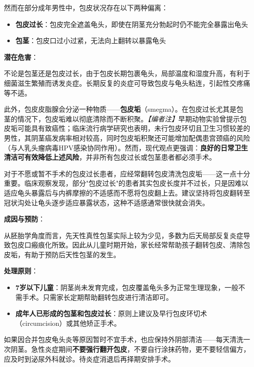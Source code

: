 然而在部分成年男性中，包皮状况存在以下两种偏离：

\begin{itemize}
	\item \textbf{包皮过长}：包皮完全遮盖龟头，即使在阴茎充分勃起时仍不能完全暴露出龟头
	\item \textbf{包茎}：包皮口过小过紧，无法向上翻转以暴露龟头
\end{itemize}

\vspace{0.5em}
\noindent\textbf{潜在危害}：

不论是包茎还是包皮过长，由于包皮长期包裹龟头，局部温度和湿度升高，有利于细菌滋生繁殖而诱发炎症。长期反复的炎症可导致包皮与龟头粘连，引起性交疼痛等不适。

此外，包皮皮脂腺会分泌一种物质——\textbf{包皮垢}（smegma）。在包皮过长尤其是包茎的情况下，包皮垢难以彻底清除而不断积聚。\textit{【编者注】}早期动物实验曾提示包皮垢可能具有致癌性；临床流行病学研究也表明，未行包皮环切且卫生习惯较差的男性，其阴茎癌发病率相对较高，同时包皮垢积聚还可能增加配偶患宫颈癌的风险（与人乳头瘤病毒HPV感染协同作用）。然而，现代观点更强调：\textbf{良好的日常卫生清洁可有效降低上述风险}，并非所有包皮过长或包茎患者都必须手术。

对于不愿或暂不手术的包皮过长患者，应经常翻转包皮清洗包皮垢——这一点十分重要。临床观察发现，部分"包皮过长"的患者其实包皮长度并不过长，只是因难以适应龟头暴露后与内裤摩擦的不适感而不愿将包皮翻上去。建议坚持将包皮翻转至冠状沟处让龟头逐步适应暴露状态，这种不适感通常很快就会消失。

\vspace{0.5em}
\noindent\textbf{成因与预防}：

从胚胎学角度而言，先天性真性包茎实际上较为少见，多数为后天局部反复炎症导致包皮口瘢痕化所致。因此从儿童时期开始，家长经常帮助孩子翻转包皮、清除包皮垢，有助于预防后天性包茎的发生。

\vspace{0.5em}
\noindent\textbf{处理原则}：
\begin{itemize}
	\item \textbf{7岁以下儿童}：阴茎尚未发育完成，包皮覆盖龟头多为正常生理现象，一般不需手术。只需家长定期帮助翻转包皮进行清洁即可。
	\item \textbf{成年人已形成的包茎和包皮过长}：原则上建议及早行包皮环切术（circumcision）或其他矫正手术。
\end{itemize}

\begin{tcolorbox}[colback=pink!5!white,colframe=red!50!black,title=贴心小叮咛]
如果因合并包皮龟头炎等原因暂时不宜手术，也应保持外阴部清洁——每天清洗一次阴茎。急性炎症期间\textbf{不要强行翻开包皮}，不要自行涂抹药物，更不要轻信偏方，应及时到泌尿外科就诊。待炎症消退后再择期安排手术。
\end{tcolorbox}
